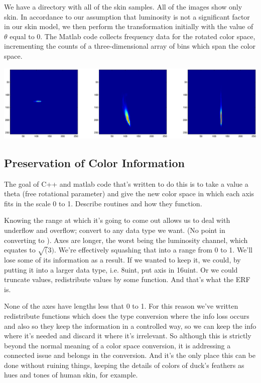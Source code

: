 \documentclass[10pt,a4paper]{article}
\begin{document}
We have a directory with all of the skin samples. All of the images show only skin. In accordance to our assumption that luminosity is not a significant factor in our skin model, we then perform the transformation initially with the value of $\theta$ equal to 0. The Matlab code collects frequency data for the rotated color space, incrementing the counts of a three-dimensional array of bins which span the color space.

\includegraphics[width=\textwidth]{binsFinal2.eps}


\subsection{Preservation of Color Information}\label{sec:PreservationOfColorInformation}

The goal of C++ and matlab code that's written to do this is to take a value a theta (free rotational parameter) and give the new color space in which each axis fits in the scale 0 to 1. Describe routines and how they function.

Knowing the range at which it's going to come out allows us to deal with underflow and overflow; convert to any data type we want. (No point in converting to ). Axes are longer, the worst being the luminosity channel, which equates to $\sqrt(3)$. We're effectively squashing that into a range from 0 to 1. We'll lose some of its information as a result. If we wanted to keep it, we could, by putting it into a larger data type, i.e. 8uint, put axis in 16uint. Or we could truncate values, redistribute values by some function. And that's what the ERF is.

None of the axes have lengths less that 0 to 1. For this reason we've written redistribute functions which does the type conversion where the info loss occurs and also so they keep the information in a controlled way, so we can keep the info where it's needed and discard it where it's irrelevant. So although this is strictly beyond the normal meaning of a color space conversion, it is addressing a connected issue and belongs in the conversion. And it's the only place this can be done without ruining things, keeping the details of colors of duck's feathers as hues and tones of human skin, for example.
\end{document}
